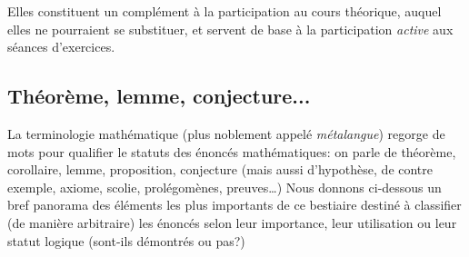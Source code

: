 \documentclass[french,course,oneside,theoremnosection]{lecture}
\begin{document}
Elles constituent un complément à la participation au cours théorique, auquel elles ne pourraient se substituer, et servent de base à la participation \emph{active} aux séances d’exercices.

\subsection{Théorème, lemme, conjecture...}
 La terminologie mathématique (plus noblement appelé \emph{métalangue}) regorge de mots pour qualifier le statuts des énoncés mathématiques: on parle de théorème, corollaire, lemme, proposition, conjecture (mais aussi d'hypothèse, de contre exemple, axiome, scolie, prolégomènes, preuves\ldots) Nous donnons ci-dessous un bref panorama des éléments les plus importants de ce bestiaire destiné à classifier (de manière arbitraire) les énoncés selon leur importance, leur utilisation ou leur statut logique (sont-ils démontrés ou pas?)
\end{document}
